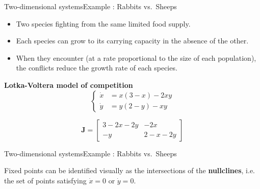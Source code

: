 \documentclass[usenames,dvipsnames,svgnames,10pt,aspectratio=169]{beamer}
\begin{document}
\begin{frame}[t, c]{Two-dimensional systems}{Example : Rabbits vs.\ Sheeps}
  \begin{minipage}{.58\textwidth}
    \begin{itemize}
    \item Two species fighting from the same limited food supply.

      \medskip

    \item Each species can grow to its carrying capacity in the absence of the other.

      \medskip

    \item When they encounter (at a rate proportional to the size of each population), the conflicts reduce the growth rate of each species.
    \end{itemize}
  \end{minipage}%
  \hfill
  \begin{minipage}{.38\textwidth}
    \centering
    \textbf{Lotka-Voltera model of competition}
    \[
    \left\{
    \begin{aligned}
      \dot{x} & = x \left( 3 - x \right) - 2xy \\
      \dot{y} & = y \left( 2 - y \right) - xy
    \end{aligned}
    \right.
    \]

    \[
    \bm{J}
    =
    \begin{bmatrix}
      3 - 2x - 2y & -2x \\
      -y & 2 - x - 2y
    \end{bmatrix}
    \]
  \end{minipage}

  \vspace{1cm}
\end{frame}

\begin{frame}[t, c]{Two-dimensional systems}{Example : Rabbits vs.\ Sheeps}
  \begin{minipage}{.48\textwidth}
    Fixed points can be identified visually as the intersections of the \textbf{nullclines}, i.e. the set of points satisfying $\dot{x} = 0$ or $\dot{y} = 0$.
  \end{minipage}%
  \hfill
  \begin{minipage}{.48\textwidth}
    \centering
  \end{minipage}

  \vspace{1cm}
\end{frame}
\end{document}
